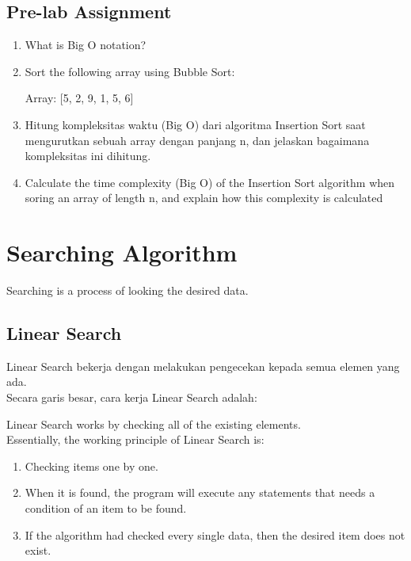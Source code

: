 \subsection{Pre-lab Assignment}
\begin{enumerate}

    \item What is Big O notation?
    \item Sort the following array using Bubble Sort:

          Array: [5, 2, 9, 1, 5, 6]
    \item Hitung kompleksitas waktu (Big O) dari algoritma Insertion Sort saat mengurutkan sebuah array dengan panjang n,
          dan jelaskan bagaimana kompleksitas ini dihitung.
    \item Calculate the time complexity (Big O) of the Insertion Sort algorithm when soring an array of length n, and
          explain how this complexity is calculated
\end{enumerate}

\section{Searching Algorithm}
Searching is a process of looking the desired data.

\subsection{Linear Search}
Linear Search bekerja dengan melakukan pengecekan kepada semua elemen yang ada.\\
Secara garis besar, cara kerja Linear Search adalah:

Linear Search works by checking all of the existing elements.\\
Essentially, the working principle of Linear Search is:

\begin{enumerate}
    \item Checking items one by one.
    \item When it is found, the program will execute any statements that needs a condition of an item to be found.
    \item If the algorithm had checked every single data, then the desired item does not exist.
\end{enumerate}

